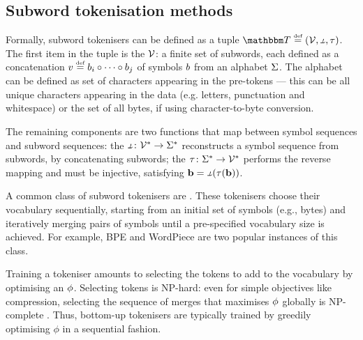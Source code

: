 
\subsection{Subword tokenisation methods}

Formally, subword tokenisers can be defined as a tuple $\tokeniser \defeq (\vocab, \detok, \tok)$. The first item in the tuple is the  $\mathcal{V}$: a finite set of subwords, each defined as a concatenation $v \mathrel{\stackrel{\textnormal{\tiny def}}{=}} b_i \circ \cdots \circ b_j$ of symbols $b$ from an alphabet $\Sigma$. The alphabet can be defined as set of characters appearing in the pre-tokens --- this can be all unique characters appearing in the data (e.g. letters, punctuation and whitespace) or the set of all bytes, if using character-to-byte conversion. %

The remaining components are two functions that map between symbol sequences and subword sequences: the  $\detok\colon \vocab^* \to \alphabet^*$ reconstructs a symbol sequence from subwords, by concatenating subwords; the  $\tau\colon \Sigma^* \to \mathcal{V}^*$ performs the reverse mapping and must be injective, satisfying $\chvec = \detok(\tok(\chvec))$.

A common class of subword tokenisers are . These tokenisers choose their vocabulary sequentially, starting from an initial set of symbols (e.g., bytes) and iteratively merging pairs of symbols until a pre-specified vocabulary size is achieved. For example, BPE \citep{gage1994new,sennrich-etal-2016-bpe} and WordPiece \citep{schuster-nakajima-2012-voice} are two popular instances of this class.

Training a tokeniser amounts to selecting the tokens to add to the vocabulary by optimising an  $\phi$. Selecting tokens is NP-hard: even for simple objectives like compression, selecting the sequence of merges that maximises $\phi$ globally is NP-complete \citep{kozma-etal-2024-theoretical, whittington2024tokenisation}. Thus, bottom-up tokenisers are typically trained by greedily optimising $\phi$ in a sequential fashion.

